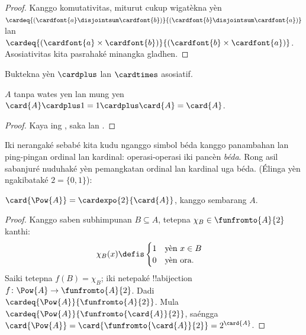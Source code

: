 \documentclass[../../../include/open-logic-section]{subfiles}
\begin{document}
\begin{proof}
Kanggo komutativitas, miturut
cukup wigatèkna yèn $\cardeq{(\cardfont{a} \disjointsum
\cardfont{b})}{(\cardfont{b} \disjointsum \cardfont{a})}$ lan
$\cardeq{(\cardfont{a} \times \cardfont{b})}{(\cardfont{b} \times
\cardfont{a})}$. Asosiativitas kita pasrahaké minangka gladhen.
\end{proof}

\begin{prob}
Buktekna yèn $\cardplus$ lan $\cardtimes$ asosiatif.
\end{prob}

\begin{prop}
$A$ tanpa wates yen lan mung yen $\card{A} \cardplus 1 = 1 \cardplus \card{A} = \card{A}$.
\end{prop}

\begin{proof}
Kaya ing
, saka
 lan
.
\end{proof}

Iki nerangaké sebabé kita kudu nganggo simbol béda kanggo
panambahan lan ping-pingan ordinal lan kardinal: operasi-operasi
iki pancèn \emph{béda}. Rong asil sabanjuré nuduhaké yèn
pemangkatan ordinal lan kardinal uga béda.
(Élinga yèn 
ngakibataké $2 = \{0,
1\}$):

\begin{lem}
$\card{\Pow{A}} = \cardexpo{2}{\card{A}}$, kanggo sembarang $A$.
\end{lem}

\begin{proof}
Kanggo saben subhimpunan $B \subseteq A$, tetepna $\chi_B \in \funfromto{A}{2}$ kanthi:
\begin{align*}
	\chi_{B}(x) &\defis
	\begin{cases}
		1 & \text{yèn }x\in B\\
		0 & \text{yèn ora.}
	\end{cases}
\end{align*}
Saiki tetepna $f(B) = \chi_B$; iki netepaké !!a{bijection} $f \colon \Pow{A}
\to \funfromto{A}{2}$. Dadi $\cardeq{\Pow{A}}{\funfromto{A}{2}}$. Mula
$\cardeq{\Pow{A}}{\funfromto{\card{A}}{2}}$, saéngga
$\card{\Pow{A}} = \card{\funfromto{\card{A}}{2}} =
2^{\card{A}}$.
\end{proof}
\end{document}
